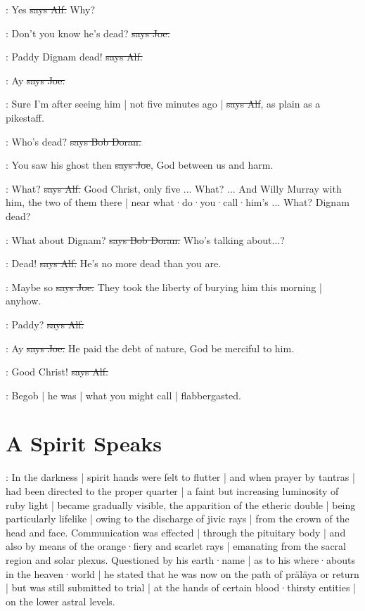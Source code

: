 \bergan:
Yes
\sout{says Alf.}
Why?

\joe:
Don't you know he's dead?
\sout{says Joe.}

\bergan:
Paddy Dignam dead!
\sout{says Alf.}

\joe:
Ay
\sout{says Joe.}

\bergan:
Sure I'm after seeing him |
not five minutes ago |
\sout{says Alf},
as plain as a pikestaff.

\doran:
Who's dead?
\sout{says Bob Doran.}

\joe:
You saw his ghost then
\sout{says Joe},
God between us and harm.

\bergan:
What?
\sout{says Alf.}
Good Christ,
only five ...
What?
...
And Willy Murray with him,
the two of them there |
near what·do·you·call·him's ...
What?
Dignam dead?

\doran:
What about Dignam?
\sout{says Bob Doran.}
Who's talking about...?

\bergan:
Dead!
\sout{says Alf.}
He's no more dead than you are.

\joe:
Maybe so
\sout{says Joe.}
They took the liberty of burying him this morning |
anyhow.

\bergan:
Paddy?
\sout{says Alf.}

\joe:
Ay
\sout{says Joe.}
He paid the debt of nature,
God be merciful to him.

\bergan:
Good Christ!
\sout{says Alf.}

\Nq:
Begob |
he was |
what you might call |
flabbergasted.


\section{A Spirit Speaks}

:
In the darkness |
spirit hands were felt to flutter |
and when prayer by tantras |
had been directed to the proper quarter |
a faint but increasing luminosity of ruby light |
became gradually visible,
the apparition of the etheric double |
being particularly lifelike |
owing to the discharge of jivic rays |
from the crown of the head and face.
Communication was effected |
through the pituitary body |
and also by means of the orange·fiery and scarlet rays |
emanating from the sacral region and solar plexus.
Questioned by his earth·name |
as to his where·abouts in the heaven·world |
he stated that he was now on the path of präläya or return |
but was still submitted to trial |
at the hands of certain blood·thirsty entities |
on the lower astral levels.


